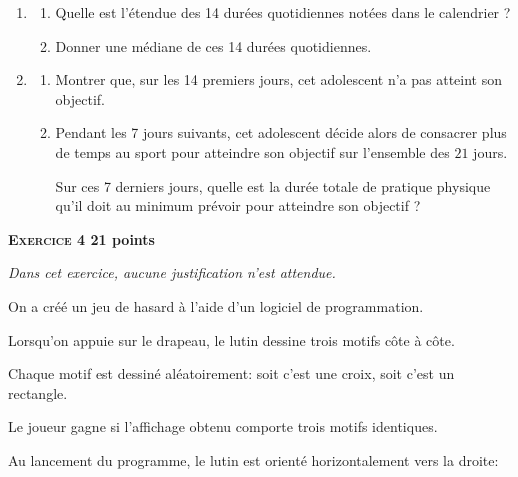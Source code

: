 \documentclass[11pt]{article}
\begin{document}
\begin{enumerate}[resume]
\item
	\begin{enumerate}
		\item Quelle est l'étendue des 14 durées quotidiennes notées dans le calendrier ?
		\item Donner une médiane de ces 14 durées quotidiennes.
	\end{enumerate}
\item
	\begin{enumerate}
		\item Montrer que, sur les 14 premiers jours, cet adolescent n'a pas atteint son objectif.
		\item Pendant les 7 jours suivants, cet adolescent décide alors de consacrer plus de temps au sport pour atteindre son objectif sur l'ensemble des $21$ jours.

Sur ces 7 derniers jours, quelle est la durée totale de pratique physique qu'il doit au minimum prévoir pour atteindre son objectif ?
	\end{enumerate}
\end{enumerate}

\bigskip

\textbf{{\large \textsc{Exercice 4}} \hfill 21 points}

\medskip

\emph{Dans cet exercice, aucune justification n'est attendue.}

\smallskip

On a créé un jeu de hasard à l'aide d'un logiciel de programmation.

Lorsqu'on appuie sur le drapeau, le lutin dessine trois motifs côte à côte.

Chaque motif est dessiné aléatoirement: soit c'est une croix, soit c'est un rectangle.

Le joueur gagne si l'affichage obtenu comporte trois motifs identiques.

Au lancement du programme, le lutin est orienté horizontalement vers la droite:
\end{document}
